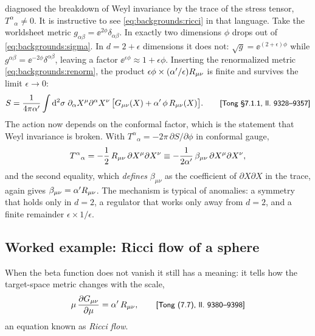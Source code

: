  diagnosed the breakdown of Weyl invariance by the trace of the
stress tensor, $T^\alpha{}_\alpha\neq0$. It is instructive to see \eqref{eq:backgrounds:ricci}
in that language. Take the worldsheet metric $g_{\alpha\beta}=\ee^{2\phi}\delta_{\alpha\beta}$.
In exactly two dimensions $\phi$ drops out of \eqref{eq:backgrounds:sigma}. In
$d=2+\epsilon$ dimensions it does not: $\sqrt g=\ee^{(2+\epsilon)\phi}$ while
$g^{\alpha\beta}=\ee^{-2\phi}\delta^{\alpha\beta}$, leaving a factor
$\ee^{\epsilon\phi}\approx1+\epsilon\phi$. Inserting the renormalized metric
\eqref{eq:backgrounds:renorm}, the product $\epsilon\phi\times(\alpha'/\epsilon)R_{\mu\nu}$ is
finite and survives the limit $\epsilon\to0$:
\begin{equation}\label{eq:backgrounds:weyl}
  S=\frac{1}{4\pi\alpha'}\int\mathrm{d}^2\sigma\;\partial_\alpha X^\mu\partial^\alpha X^\nu\,
  \bigl[G_{\mu\nu}(X)+\alpha'\,\phi\,R_{\mu\nu}(X)\bigr].
  \qquad\text{{\small\textsf{[Tong §7.1.1, ll.~9328--9357]}}}
\end{equation}
The action now depends on the conformal factor, which is the statement that Weyl invariance
is broken. With $T^\alpha{}_\alpha=-2\pi\,\partial S/\partial\phi$ in conformal gauge,
\begin{equation}\label{eq:backgrounds:trace}
  T^\alpha{}_\alpha=-\frac12\,R_{\mu\nu}\,\partial X^\mu\partial X^\nu
  \equiv-\frac{1}{2\alpha'}\,\beta_{\mu\nu}\,\partial X^\mu\partial X^\nu ,
\end{equation}
and the second equality, which \emph{defines} $\beta_{\mu\nu}$ as the coefficient of
$\partial X\partial X$ in the trace, again gives $\beta_{\mu\nu}=\alpha' R_{\mu\nu}$.
 The mechanism is typical of anomalies: a symmetry that
holds only in $d=2$, a regulator that works only away from $d=2$, and a finite remainder
$\epsilon\times1/\epsilon$.

\subsection{Worked example: Ricci flow of a sphere}

When the beta function does not vanish it still has a meaning: it tells how the target-space
metric changes with the scale,
\begin{equation}\label{eq:backgrounds:flow}
  \mu\,\frac{\partial G_{\mu\nu}}{\partial\mu}=\alpha'\,R_{\mu\nu},
  \qquad\text{{\small\textsf{[Tong (7.7), ll.~9380--9398]}}}
\end{equation}
an equation known as \emph{Ricci flow}.

